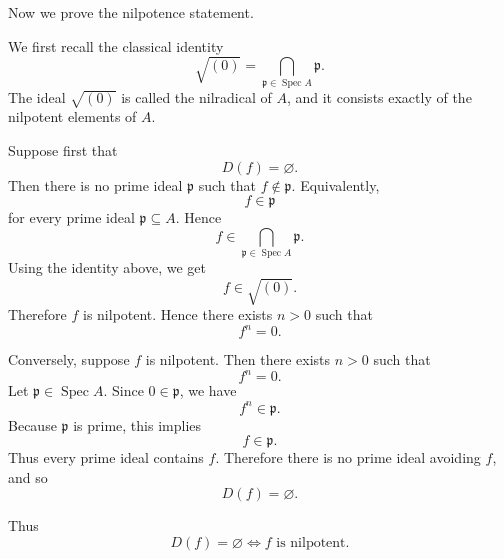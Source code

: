 	\bigskip
	
	Now we prove the nilpotence statement.
	
	We first recall the classical identity
	\[
	\sqrt{(0)}
	=
	\bigcap_{\mathfrak p\in \operatorname{Spec} A}\mathfrak p.
	\]
	The ideal \(\sqrt{(0)}\) is called the nilradical of \(A\), and it consists
	exactly of the nilpotent elements of \(A\).
	
	Suppose first that
	\[
	D(f)=\varnothing.
	\]
	Then there is no prime ideal \(\mathfrak p\) such that \(f\notin \mathfrak p\).
	Equivalently,
	\[
	f\in \mathfrak p
	\]
	for every prime ideal \(\mathfrak p\subseteq A\). Hence
	\[
	f\in \bigcap_{\mathfrak p\in \operatorname{Spec} A}\mathfrak p.
	\]
	Using the identity above, we get
	\[
	f\in \sqrt{(0)}.
	\]
	Therefore \(f\) is nilpotent. Hence there exists \(n>0\) such that
	\[
	f^n=0.
	\]
	
	Conversely, suppose \(f\) is nilpotent. Then there exists \(n>0\) such that
	\[
	f^n=0.
	\]
	Let \(\mathfrak p\in \operatorname{Spec} A\). Since \(0\in \mathfrak p\), we have
	\[
	f^n\in \mathfrak p.
	\]
	Because \(\mathfrak p\) is prime, this implies
	\[
	f\in \mathfrak p.
	\]
	Thus every prime ideal contains \(f\). Therefore there is no prime ideal avoiding
	\(f\), and so
	\[
	D(f)=\varnothing.
	\]
	
	Thus
	\[
	\boxed{
		D(f)=\varnothing
		\iff
		f\text{ is nilpotent}.
	}
	\]
